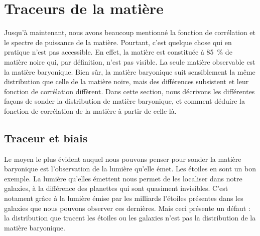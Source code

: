 \documentclass[11pt, twoside, a4paper, openright]{report}
\begin{document}
\section{Traceurs de la matière}
Jusqu'à maintenant, nous avons beaucoup mentionné la fonction de corrélation et le spectre de puissance de la matière. Pourtant, c'est quelque chose qui en pratique n'est pas accessible. En effet, la matière est constituée à \SI{85}{\percent} de matière noire qui, par définition, n'est pas visible. La seule matière observable est la matière baryonique. Bien sûr, la matière baryonique suit sensiblement la même distribution que celle de la matière noire, mais des différences subsistent et leur fonction de corrélation diffèrent. Dans cette section, nous décrivons les différentes façons de sonder la distribution de matière baryonique, et comment déduire la fonction de corrélation de la matière à partir de celle-là.

\subsection{Traceur et biais}
Le moyen le plus évident auquel nous pouvons penser pour sonder la matière baryonique est l'observation de la lumière qu'elle émet. Les étoiles en sont un bon exemple. La lumière qu'elles émettent nous permet de les localiser dans notre galaxies, à la différence des planettes qui sont quasiment invisibles. C'est notament grâce à la lumière émise par les milliards l'étoiles présentes dans les galaxies que nous pouvons observer ces dernières. Mais ceci présente un défaut : la distribution que tracent les étoiles ou les galaxies n'est pas la distribution de la matière baryonique.
\end{document}
